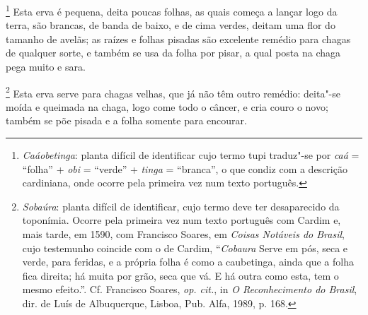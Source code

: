 \footnote{ \textit{Caáobetinga}: planta difícil
de identificar cujo termo tupi traduz"-se por \textit{caá} = ``folha'' +
\textit{obi} = ``verde'' + \textit{tinga} = ``branca'', o que condiz com a
descrição cardiniana, onde ocorre pela primeira vez num texto
português.} Esta erva é pequena, deita poucas folhas, as
quais começa a lançar logo da terra, são brancas, de banda de baixo, e
de cima verdes, deitam uma flor do tamanho de avelãs; as raízes e
folhas pisadas são excelente remédio para chagas de qualquer sorte, e
também se usa da folha por pisar, a qual posta na chaga pega muito e sara.

\footnote{ \textit{Sobaúra}: planta difícil de
identificar, cujo termo deve ter desaparecido da toponímia. Ocorre pela
primeira vez num texto português com Cardim e, mais tarde, em 1590, com
Francisco Soares, em \textit{Coisas Notáveis do Brasil}, cujo
testemunho coincide com o de Cardim, ``\textit{Cobaura} Serve em pós,
seca e verde, para feridas, e a própria folha é como a caubetinga,
ainda que a folha fica direita; há muita por grão, seca que vá. E há
outra como esta, tem o mesmo efeito.''. Cf. Francisco Soares,
\textit{op. cit.}, in \textit{O Reconhecimento do Brasil}, dir. de Luís
de Albuquerque, Lisboa, Pub. Alfa, 1989, p. 168.} Esta erva
serve para chagas velhas, que já não têm outro remédio: deita"-se moída
e queimada na chaga, logo come todo o câncer, e cria couro o novo;
também se põe pisada e a folha somente para encourar.

